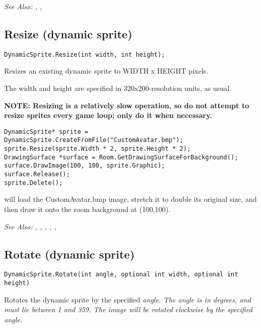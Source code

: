 \it{See Also:} ,
,


\subsection{Resize (dynamic sprite)}\label{DynamicSprite.Resize}%

\begin{verbatim}
DynamicSprite.Resize(int width, int height);
\end{verbatim}
Resizes an existing dynamic sprite to WIDTH x HEIGHT pixels.

The width and height are specified in 320x200-resolution units, as usual.

\bf{NOTE:} Resizing is a relatively slow operation, so do not attempt to resize sprites
every game loop; only do it when necessary.

\begin{verbatim}
DynamicSprite* sprite = DynamicSprite.CreateFromFile("CustomAvatar.bmp");
sprite.Resize(sprite.Width * 2, sprite.Height * 2);
DrawingSurface *surface = Room.GetDrawingSurfaceForBackground();
surface.DrawImage(100, 100, sprite.Graphic);
surface.Release();
sprite.Delete();
\end{verbatim}
will load the CustomAvatar.bmp image, stretch it to double its original size, and then
draw it onto the room background at (100,100).

\it{See Also:} ,
,
,
,
,


\subsection{Rotate (dynamic sprite)}\label{DynamicSprite.Rotate}%

\begin{verbatim}
DynamicSprite.Rotate(int angle, optional int width, optional int height)
\end{verbatim}
Rotates the dynamic sprite by the specified \it{angle}. The angle is in degrees,
and must lie between 1 and 359. The image will be rotated clockwise by the specified angle.

